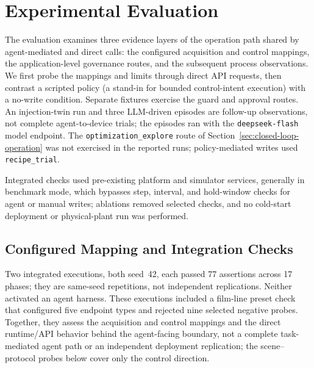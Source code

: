 \section{Experimental Evaluation}
\label{sec:eval}
The evaluation examines three evidence layers of the operation path shared by agent-mediated and direct calls: the configured acquisition and control mappings, the application-level governance routes, and the subsequent process observations. We first probe the mappings and limits through direct API requests, then contrast a scripted policy (a stand-in for bounded control-intent execution) with a no-write condition. Separate fixtures exercise the guard and approval routes. An injection-twin run and three LLM-driven episodes are follow-up observations, not complete agent-to-device trials; the episodes ran with the \texttt{deepseek-flash} model endpoint. The \texttt{optimization\_explore} route of Section~\ref{sec:closed-loop-operation} was not exercised in the reported runs; policy-mediated writes used \texttt{recipe\_trial}.

Integrated checks used pre-existing platform and simulator services, generally in benchmark mode, which bypasses step, interval, and hold-window checks for agent or manual writes; ablations removed selected checks, and no cold-start deployment or physical-plant run was performed.

\subsection{Configured Mapping and Integration Checks}
\label{sec:eval-mapping}
Two integrated executions, both seed~42, each passed 77 assertions across 17 phases; they are same-seed repetitions, not independent replications. Neither activated an agent harness. These executions included a film-line preset check that configured five endpoint types and rejected nine selected negative probes. Together, they assess the acquisition and control mappings and the direct runtime/API behavior behind the agent-facing boundary, not a complete task-mediated agent path or an independent deployment replication; the scene--protocol probes below cover only the control direction.

